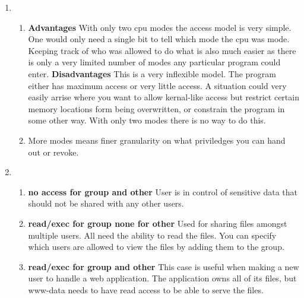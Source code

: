 \documentclass{article}
\begin{document}
\begin{enumerate}
  \item
    \begin{enumerate}
    \item
      {\bf Advantages} With only two cpu modes the access model is very simple. One would only need a single bit to tell which mode the cpu was mode. Keeping track of who was allowed to do what is also much easier as there is only a very limited number of modes any particular program could enter.
      {\bf Disadvantages} This is a very inflexible model. The program either has maximum access or very little access. A situation could very easily arrise where you want to allow kernal-like access but restrict certain memory locations form being overwritten, or constrain the program in some other way. With only two modes there is no way to do this.
    \item
      More modes means finer granularity on what priviledges you can hand out or revoke.
    \end{enumerate}

  \item
    \begin{enumerate}
    \item
      {\bf no access for group and other} User is in control of sensitive data that should not be shared with any other users.
    \item
      {\bf read/exec for group none for other} Used for sharing files amongst multiple users. All need the ability to read the files. You can specify which users are allowed to view the files by adding them to the group.
    \item
      {\bf read/exec for group and other} This case is useful when making a new user to handle a web application. The application owns all of its files, but www-data needs to have read access to be able to serve the files.
    \end{enumerate}
\end{enumerate}
\end{document}
